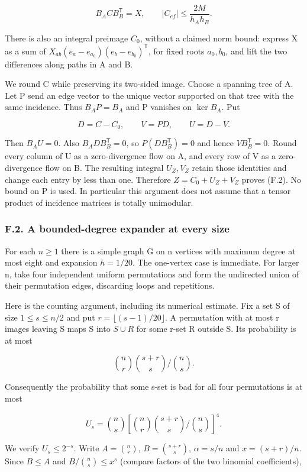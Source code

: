 \documentclass[english,11pt,a4paper]{article}
\begin{document}
\[B_A C B_B^{\mathsf T}=X,\qquad |C_{ef}|\le\frac{2M}{h_Ah_B}.\tag{F.3}\]

There is also an integral preimage \(C_{0}\), without a claimed norm bound: express X as a sum of \(X_{ab}(e_a-e_{a_0})(e_b-e_{b_0})^{\mathsf T}\), for fixed roots \(a_0,b_0\), and lift the two differences along paths in A and B.

We round C while preserving its two-sided image. Choose a spanning tree of A. Let P send an edge vector to the unique vector supported on that tree with the same incidence. Thus \(B_AP=B_A\) and P vanishes on \(\ker B_A\). Put

\[D=C-C_0,\qquad V=PD,\qquad U=D-V.\]

Then \(B_AU=0\). Also \(B_A D B_B^{\mathsf T}=0\), so \(P(DB_B^{\mathsf T})=0\) and hence \(VB_B^{\mathsf T}=0\). Round every column of U as a zero-divergence flow on A, and every row of V as a zero-divergence flow on B. The resulting integral \(U_{Z},V_{Z}\) retain those identities and change each entry by less than one. Therefore \(Z=C_{0}+U_{Z}+V_{Z}\) proves (F.2). No bound on P is used. In particular this argument does not assume that a tensor product of incidence matrices is totally unimodular.

\subsubsection{F.2. A bounded-degree expander at every size}\label{f.2.-a-bounded-degree-expander-at-every-size}

For each \(n\ge 1\) there is a simple graph G on n vertices with maximum degree at most eight and expansion \(h=1/20\). The one-vertex case is immediate. For larger n, take four independent uniform permutations and form the undirected union of their permutation edges, discarding loops and repetitions.

Here is the counting argument, including its numerical estimate. Fix a set S of size \(1\le s\le n/2\) and put \(r=\lfloor (s-1)/20\rfloor\). A permutation with at most r images leaving S maps S into \(S\cup R\) for some r-set R outside S. Its probability is at most

\[\binom nr\binom{s+r}s\big/\binom ns.\]

Consequently the probability that some s-set is bad for all four permutations is at most

\[U_s=\binom ns\left[\binom nr\binom{s+r}s\big/\binom ns\right]^4.\]

We verify \(U_{s}\le 2^{-s}\). Write \(A=\binom{n}{r}\), \(B=\binom{s+r}{s}\), \(\alpha=s/n\) and \(x=(s+r)/n\). Since \(B\le A\) and \(B/\binom{n}{s}\le x^{s}\) (compare factors of the two binomial coefficients),
\end{document}
